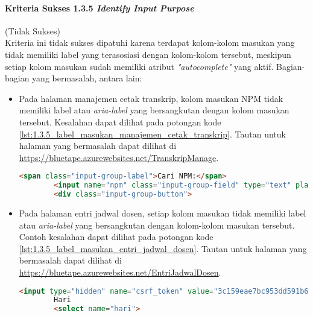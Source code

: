 \paragraph{Kriteria Sukses 1.3.5 \textit{Identify Input Purpose}}
\label{par:kepatuhan_bluetape_kriteria_sukses_1.3.5}
(Tidak Sukses)\\

Kriteria ini tidak sukses dipatuhi karena terdapat kolom-kolom masukan yang tidak memiliki label yang terasosiasi dengan kolom-kolom tersebut, meskipun setiap kolom masukan sudah memiliki atribut \textit{"autocomplete"} yang aktif. Bagian-bagian yang bermasalah, antara lain:
\begin{itemize}
    \item Pada halaman manajemen cetak transkrip, kolom masukan NPM tidak memiliki label atau \textit{aria-label} yang bersangkutan dengan kolom masukan tersebut. Kesalahan dapat dilihat pada potongan kode \ref{lst:1.3.5_label_masukan_manajemen_cetak_transkrip}. Tautan untuk halaman yang bermasalah dapat dilihat di \url{https://bluetape.azurewebsites.net/TranskripManage}.
    \begin{lstlisting}[frame=single, label={lst:1.3.5_label_masukan_manajemen_cetak_transkrip}, language=HTML, caption=Kriteria Sukses 1.3.5 - Tidak Terdapat Label pada Kolom Masukan di Halaman Manajemen Cetak Transkrip]
        <span class="input-group-label">Cari NPM:</span>
        <input name="npm" class="input-group-field" type="text" placeholder="2013730013" maxlength="10" minlength="10"/>
        <div class="input-group-button">
    \end{lstlisting}
    
    \item Pada halaman entri jadwal dosen, setiap kolom masukan tidak memiliki label atau \textit{aria-label} yang bersangkutan dengan kolom-kolom masukan tersebut. Contoh kesalahan dapat dilihat pada potongan kode \ref{lst:1.3.5_label_masukan_entri_jadwal_dosen}. Tautan untuk halaman yang bermasalah dapat dilihat di \url{https://bluetape.azurewebsites.net/EntriJadwalDosen}.
    \begin{lstlisting}[frame=single, label={lst:1.3.5_label_masukan_entri_jadwal_dosen}, language=HTML, caption=Kriteria Sukses 1.3.5 - Tidak Terdapat Label pada Kolom Masukan di Halaman Entri Jadwal Dosen]
        <input type="hidden" name="csrf_token" value="3c159eae7bc953dd591b679c080ed066" />
        Hari
        <select name="hari">
    \end{lstlisting}
\end{itemize}

